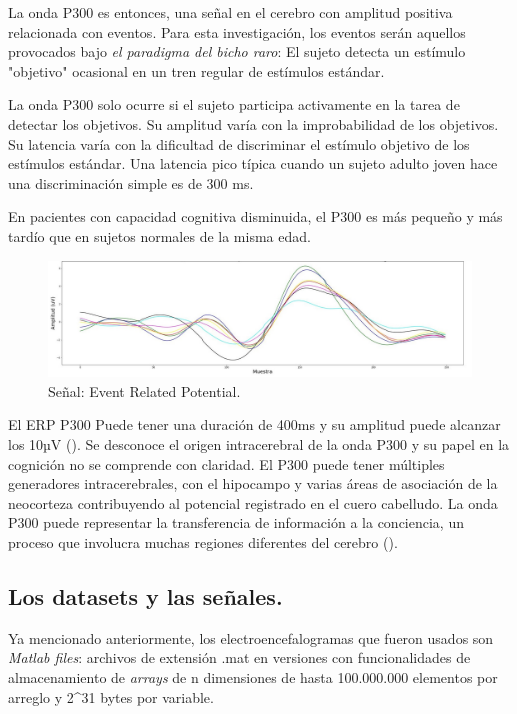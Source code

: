 \documentclass[../00_Main.tex]{subfiles}
\begin{document}
La onda P300 es entonces, una señal en el cerebro con amplitud positiva relacionada con eventos. Para esta investigación, los eventos serán aquellos provocados bajo \textit{el paradigma del bicho raro}: El sujeto detecta un estímulo "objetivo" ocasional en un tren regular de estímulos estándar. 

La onda P300 solo ocurre si el sujeto participa activamente en la tarea de detectar los objetivos. Su amplitud varía con la improbabilidad de los objetivos. Su latencia varía con la dificultad de discriminar el estímulo objetivo de los estímulos estándar. Una latencia pico típica cuando un sujeto adulto joven hace una discriminación simple es de 300 ms.

En pacientes con capacidad cognitiva disminuida, el P300 es más pequeño y más tardío que en sujetos normales de la misma edad.

\begin{figure}[H]
    \raggedright
    \includegraphics[scale=0.26]{02_Images/ERPTemplate}
    \caption{Señal: Event Related Potential.}
    \label{fig:ERPTemplate}
\end{figure}

El ERP P300 Puede tener una duración de 400ms y su amplitud puede alcanzar los 10µV (\cite{IntroductionBCIRao}). Se desconoce el origen intracerebral de la onda P300 y su papel en la cognición no se comprende con claridad. El P300 puede tener múltiples generadores intracerebrales, con el hipocampo y varias áreas de asociación de la neocorteza contribuyendo al potencial registrado en el cuero cabelludo. La onda P300 puede representar la transferencia de información a la conciencia, un proceso que involucra muchas regiones diferentes del cerebro (\cite{P300ofhumanERP}).

\subsection{Los datasets y las señales.}
Ya mencionado anteriormente, los electroencefalogramas que fueron usados son \textit{Matlab files}: archivos de extensión .mat en versiones con funcionalidades de almacenamiento de \textit{arrays} de n dimensiones de hasta 100.000.000 elementos por arreglo y 2^{31} bytes por variable. 
\end{document}
